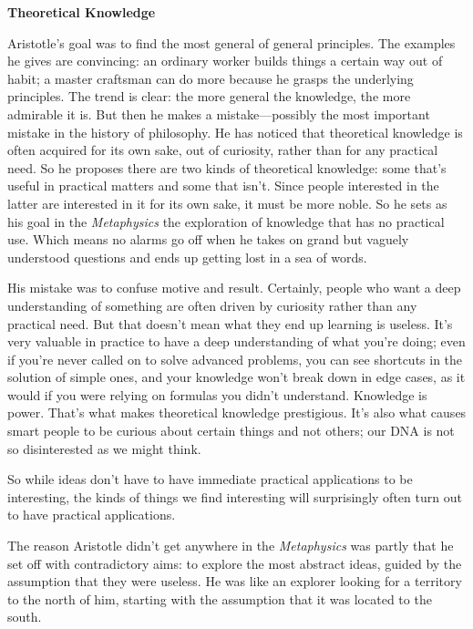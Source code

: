 \textbf{Theoretical Knowledge}

Aristotle's goal was to find the most general of general principles. The
examples he gives are convincing: an ordinary worker builds things a
certain way out of habit; a master craftsman can do more because he
grasps the underlying principles. The trend is clear: the more general
the knowledge, the more admirable it is. But then he makes a
mistake---possibly the most important mistake in the history of
philosophy. He has noticed that theoretical knowledge is often acquired
for its own sake, out of curiosity, rather than for any practical need.
So he proposes there are two kinds of theoretical knowledge: some that's
useful in practical matters and some that isn't. Since people interested
in the latter are interested in it for its own sake, it must be more
noble. So he sets as his goal in the \emph{Metaphysics} the exploration
of knowledge that has no practical use. Which means no alarms go off
when he takes on grand but vaguely understood questions and ends up
getting lost in a sea of words.

His mistake was to confuse motive and result. Certainly, people who want
a deep understanding of something are often driven by curiosity rather
than any practical need. But that doesn't mean what they end up learning
is useless. It's very valuable in practice to have a deep understanding
of what you're doing; even if you're never called on to solve advanced
problems, you can see shortcuts in the solution of simple ones, and your
knowledge won't break down in edge cases, as it would if you were
relying on formulas you didn't understand. Knowledge is power. That's
what makes theoretical knowledge prestigious. It's also what causes
smart people to be curious about certain things and not others; our DNA
is not so disinterested as we might think.

So while ideas don't have to have immediate practical applications to be
interesting, the kinds of things we find interesting will surprisingly
often turn out to have practical applications.

The reason Aristotle didn't get anywhere in the \emph{Metaphysics} was
partly that he set off with contradictory aims: to explore the most
abstract ideas, guided by the assumption that they were useless. He was
like an explorer looking for a territory to the north of him, starting
with the assumption that it was located to the south.

